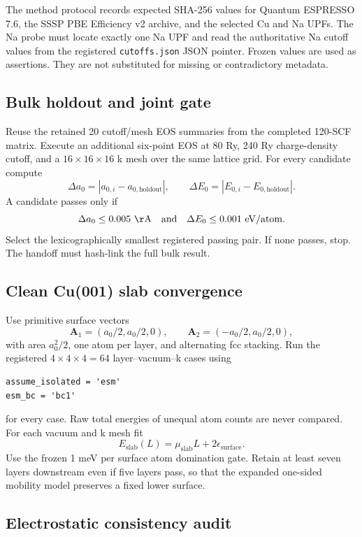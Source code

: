 The method protocol records expected SHA-256 values for Quantum ESPRESSO 7.6,
the SSSP PBE Efficiency v2 archive, and the selected Cu and Na UPFs.  The Na
probe must locate exactly one Na UPF and read the authoritative Na cutoff values
from the registered \texttt{cutoffs.json} JSON pointer.  Frozen values are used
as assertions.  They are not substituted for missing or contradictory metadata.

\subsection*{Bulk holdout and joint gate}

Reuse the retained 20 cutoff/mesh EOS summaries from the completed 120-SCF
matrix.  Execute an additional six-point EOS at 80 Ry, 240 Ry charge-density
cutoff, and a $16\times16\times16$ k mesh over the same lattice grid.  For every
candidate compute
\[
 \Delta a_0=|a_{0,i}-a_{0,\mathrm{holdout}}|,
 \qquad
 \Delta E_0=|E_{0,i}-E_{0,\mathrm{holdout}}|.
\]
A candidate passes only if
\[
 \Delta a_0\leq0.005~\mathrm{\AA}
 \quad\text{and}\quad
 \Delta E_0\leq0.001~\mathrm{eV/atom}.
\]
Select the lexicographically smallest registered passing pair.  If none passes,
stop.  The handoff must hash-link the full bulk result.

\subsection*{Clean Cu(001) slab convergence}

Use primitive surface vectors
\[
 \mathbf A_1=(a_0/2,a_0/2,0),\qquad
 \mathbf A_2=(-a_0/2,a_0/2,0),
\]
with area $a_0^2/2$, one atom per layer, and alternating fcc stacking.  Run the
registered $4\times4\times4=64$ layer--vacuum--k cases using
\begin{verbatim}
assume_isolated = 'esm'
esm_bc = 'bc1'
\end{verbatim}
for every case.  Raw total energies of unequal atom counts are never compared.
For each vacuum and k mesh fit
\[
 E_{\mathrm{slab}}(L)=\mu_{\mathrm{slab}}L+2\epsilon_{\mathrm{surface}}.
\]
Use the frozen 1 meV per surface atom domination gate.  Retain at least seven
layers downstream even if five layers pass, so that the expanded one-sided
mobility model preserves a fixed lower surface.

\subsection*{Electrostatic consistency audit}

